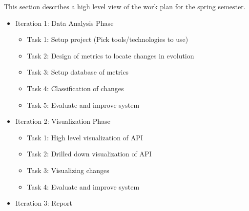This section describes a high level view of the work plan for the spring semester.

\begin{itemize}
    \item Iteration 1: Data Analysis Phase
    \begin{itemize}
        \item Task 1: Setup project (Pick tools/technologies to use)
        \item Task 2: Design of metrics to locate changes in evolution
        \item Task 3: Setup database of metrics
        \item Task 4: Classification of changes
        \item Task 5: Evaluate and improve system
    \end{itemize}
    \item Iteration 2: Visualization Phase
    \begin{itemize}
        \item Task 1: High level visualization of API
        \item Task 2: Drilled down visualization of API
        \item Task 3: Visualizing changes
        \item Task 4: Evaluate and improve system
    \end{itemize}
    \item Iteration 3: Report
\end{itemize}
